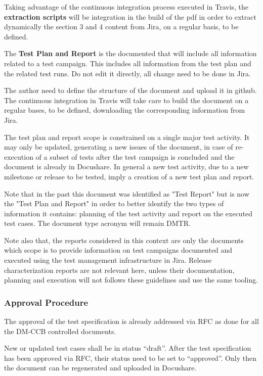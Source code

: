 Taking advantage of the continuous integration process executed in Travis, the {\bf extraction scripts} will be integration in the build of the pdf in order to extract dynamically the section 3 and 4 content from Jira, on a regular basis, to be defined.


The {\bf Test Plan and Report} is the documented that will include all information related to a test campaign.
This includes all information from the test plan and the related test runs.
Do not edit it directly, all change need to be done in Jira.

The author need to define the structure of the document and upload it in github. The continuous integration in Travis will take care to build the document on a regular bases, to be defined, downloading the corresponding information from Jira.

The test plan and report scope is constrained on a single major test activity. It may only be updated, generating a new issues of the document, in case of re-execution of a subset of tests after the test campaign is concluded and the document is already in Docushare.
In general a new test activity, due to a new milestone or release to be tested, imply a creation of a new test plan and report.

Note that in the past this document was identified as "Test Report" but is now
the "Test Plan and Report" in order to better identify the two types of information it contains: planning of the test activity and report on the executed test cases. The document type acronym will remain DMTR.

Note also that, the reports considered in this context are only the documents which scope is to provide information on test campaigns documented and executed using the test management infrastructure in Jira. Release characterization reports are not relevant here, unless their documentation, planning and execution will not follows these guidelines and use the same tooling.


\subsubsection{Approval Procedure}

The approval of the test specification is already addressed via RFC as done for all the DM-CCB controlled documents.

New or updated test cases shall be in status ``draft''. After the test specification has been approved via RFC, their status need to be set to ``approved''.
Only then the document can be regenerated and uploaded in Docushare.

